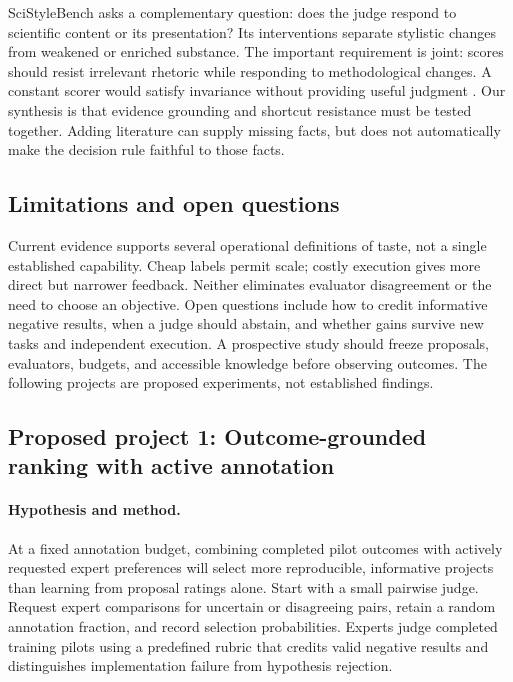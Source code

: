 SciStyleBench asks a complementary question: does the judge respond to scientific content or its presentation? Its interventions separate stylistic changes from weakened or enriched substance. The important requirement is joint: scores should resist irrelevant rhetoric while responding to methodological changes. A constant scorer would satisfy invariance without providing useful judgment \cite{scistylebench}. Our synthesis is that evidence grounding and shortcut resistance must be tested together. Adding literature can supply missing facts, but does not automatically make the decision rule faithful to those facts.

\subsection{Limitations and open questions}

Current evidence supports several operational definitions of taste, not a single established capability. Cheap labels permit scale; costly execution gives more direct but narrower feedback. Neither eliminates evaluator disagreement or the need to choose an objective. Open questions include how to credit informative negative results, when a judge should abstain, and whether gains survive new tasks and independent execution. A prospective study should freeze proposals, evaluators, budgets, and accessible knowledge before observing outcomes. The following projects are proposed experiments, not established findings.

\subsection{Proposed project 1: Outcome-grounded ranking with active annotation}

\paragraph{Hypothesis and method.}
At a fixed annotation budget, combining completed pilot outcomes with actively requested expert preferences will select more reproducible, informative projects than learning from proposal ratings alone. Start with a small pairwise judge. Request expert comparisons for uncertain or disagreeing pairs, retain a random annotation fraction, and record selection probabilities. Experts judge completed training pilots using a predefined rubric that credits valid negative results and distinguishes implementation failure from hypothesis rejection.

